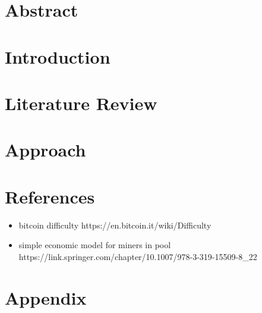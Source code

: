 



\nocite{*} %

\maketitle

\thispagestyle{empty}

\newpage

\setcounter{page}{1}

\section{Abstract}



\section{Introduction}



\section{Literature Review}



\section{Approach}



\newpage

\section{References}

\begin{itemize}
  \item bitcoin difficulty https://en.bitcoin.it/wiki/Difficulty
  \item simple economic model for miners in pool https://link.springer.com/chapter/10.1007/978-3-319-15509-8\_22
\end{itemize}

\printbibliography[heading=none]

\section{Appendix}


